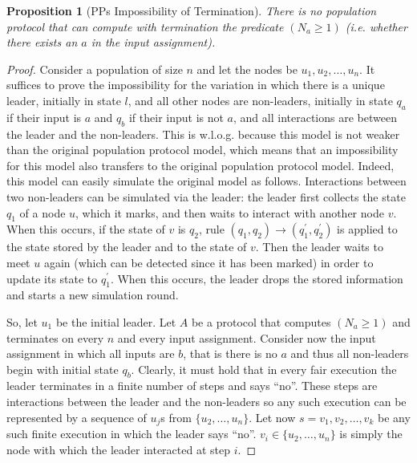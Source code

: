 \documentclass[preprint]{elsarticle}
\newcommand{\ra}{\rightarrow}
\newtheorem{proposition}{Proposition}
\begin{document}
\begin{proposition} [PPs Impossibility of Termination] \label{pro:pp-termination-impossibility}
There is no population protocol that can compute with termination the predicate $(N_a\geq 1)$ (i.e. whether there exists an $a$ in the input assignment).
\end{proposition}
\begin{proof}
Consider a population of size $n$ and let the nodes be $u_1,u_2,\ldots,u_n$. It suffices to prove the impossibility for the variation in which there is a unique leader, initially in state $l$, and all other nodes are non-leaders, initially in state $q_a$ if their input is $a$ and $q_b$ if their input is not $a$, and all interactions are between the leader and the non-leaders. This is w.l.o.g. because this model is not weaker than the original population protocol model, which means that an impossibility for this model also transfers to the original population protocol model. Indeed, this model can easily simulate the original model as follows. Interactions between two non-leaders can be simulated via the leader: the leader first collects the state $q_1$ of a node $u$, which it marks, and then waits to interact with another node $v$. When this occurs, if the state of $v$ is $q_2$, rule $(q_1,q_2)\ra (q_1^\prime,q_2^\prime)$ is applied to the state stored by the leader and to the state of $v$. Then the leader waits to meet $u$ again (which can be detected since it has been marked) in order to update its state to $q_1^\prime$. When this occurs, the leader drops the stored information and starts a new simulation round.

So, let $u_1$ be the initial leader. Let $A$ be a protocol that computes $(N_a\geq 1)$ and terminates on every $n$ and every input assignment. Consider now the input assignment in which all inputs are $b$, that is there is no $a$ and thus all non-leaders begin with initial state $q_b$. Clearly, it must hold that in every fair execution the leader terminates in a finite number of steps and says ``no''. These steps are interactions between the leader and the non-leaders so any such execution can be represented by a sequence of $u_j$s from $\{u_2,\ldots,u_n\}$. Let now $s=v_1,v_2,\ldots,v_k$ be any such finite execution in which the leader says ``no''. $v_i\in \{u_2,\ldots,u_n\}$ is simply the node with which the leader interacted at step $i$.


\end{proof}
\end{document}
